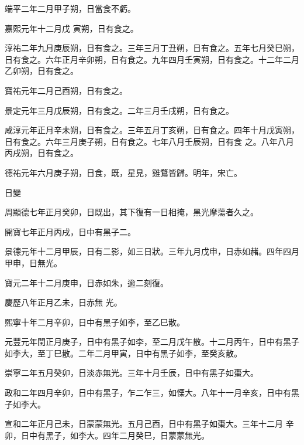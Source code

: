 \begin{pinyinscope}
 端平二年二月甲子朔，日當食不虧。



 嘉熙元年十二月戊
 寅朔，日有食之。



 淳祐二年九月庚辰朔，日有食之。三年三月丁丑朔，日有食之。五年七月癸巳朔，日有食之。六年正月辛卯朔，日有食之。九年四月壬寅朔，日有食之。十二年二月乙卯朔，日有食之。



 寶祐元年二月己酉朔，日有食之。



 景定元年三月戊辰朔，日有食之。二年三月壬戌朔，日有食之。



 咸淳元年正月辛未朔，日有食之。三年五月丁亥朔，日有食之。四年十月戊寅朔，日有食之。六年三月庚子朔，日有食之。七年八月壬辰朔，日有食
 之。八年八月丙戌朔，日有食之。



 德祐元年六月庚子朔，日食，既，星見，雞鶩皆歸。明年，宋亡。



 日變



 周顯德七年正月癸卯，日既出，其下復有一日相掩，黑光摩蕩者久之。



 開寶七年正月丙戌，日中有黑子二。



 景德元年十二月甲辰，日有二影，如三日狀。三年九月戊申，日赤如赭。四年四月甲申，日無光。



 寶元二年十二月庚申，日赤如朱，逾二刻復。



 慶歷八年正月乙未，日赤無
 光。



 熙寧十年二月辛卯，日中有黑子如李，至乙巳散。



 元豐元年閏正月庚子，日中有黑子如李，至二月戊午散。十二月丙午，日中有黑子如李大，至丁巳散。二年二月甲寅，日中有黑子如李，至癸亥散。



 崇寧二年五月癸卯，日淡赤無光。三年十月壬辰，日中有黑子如棗大。



 政和二年四月辛卯，日中有黑子，乍二乍三，如慄大。八年十一月辛亥，日中有黑子如李大。



 宣和二年正月己未，日蒙蒙無光。五月己酉，日中有黑子如棗大。三年十二月
 辛卯，日中有黑子，如李大。四年二月癸巳，日蒙蒙無光。




\end{pinyinscope}
